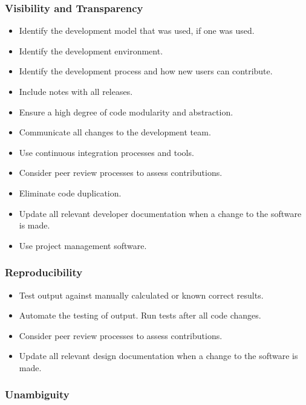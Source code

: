 \documentclass[12pt, notitlepage]{article}
\begin{document}
\subsubsection{Visibility and Transparency}

\begin{itemize}
	\item Identify the development model that was used, if one was used.
	\item Identify the development environment.
	\item Identify the development process and how new users can contribute. 
	\item Include notes with all releases.
	\item Ensure a high degree of code modularity and abstraction.
	\item Communicate all changes to the development team.
	\item Use continuous integration processes and tools.
	\item Consider peer review processes to assess contributions. 
	\item Eliminate code duplication.
	\item Update all relevant developer documentation when a change to the software is made.
	\item Use project management software.
\end{itemize}

\subsubsection{Reproducibility}

\begin{itemize}
	\item Test output against manually calculated or known correct results.
	\item Automate the testing of output. Run tests after all code changes.
	\item Consider peer review processes to assess contributions. 
	\item Update all relevant design documentation when a change to the software is made.
\end{itemize}

\subsubsection{Unambiguity}
\end{document}
